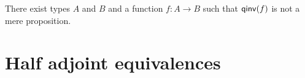 \documentclass[hott-all.tex]{subfiles}
\begin{document}
\begin{thm}\label{thm:qinv-notprop}
  There exist types $A$ and $B$ and a function $f:A\to B$ such that $\mathsf{qinv}(f)$ is not a mere proposition.
\end{thm}
%
%
%
%
%

\section{Half adjoint equivalences}
\label{sec:hae}
%
%
\end{document}
